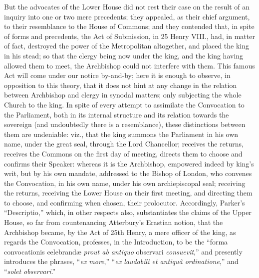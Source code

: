 But the advocates of the Lower
House did not rest their case on the result of an inquiry into one or
two mere precedents; they appealed, as their chief argument, to their
resemblance to the House of Commons; and they contended that, in spite
of forms and precedents, the Act of Submission, in 25 Henry VIII.,
had, in matter of fact, destroyed the power of the Metropolitan
altogether, and placed the king in his stead; so that the clergy being
now under the king, and the king having allowed them to meet, the
Archbishop could not interfere with them. This famous Act will come
under our notice by-and-by; here it is enough to observe, in
opposition to this theory, that it does not hint at any change in the
relation between Archbishop and clergy in synodal matters; only
subjecting the whole Church to the king. In spite of every attempt to
assimilate the Convocation to the Parliament, both in its internal
structure and its relation towards the sovereign (and undoubtedly
there is a resemblance), these distinctions between them are
undeniable: viz., that the king summons the Parliament in his own
name, under the great seal, through the Lord Chancellor; receives the
returns, receives the Commons on the first day of meeting, directs
them to choose and confirms their Speaker: whereas it is the
Archbishop, empowered indeed by king's writ, but by his own mandate,
addressed to the Bishop of London, who convenes the Convocation, in
his own name, under his own archiepiscopal seal; receiving the
returns, receiving the Lower House on their first meeting, and
directing them to choose, and confirming when chosen, their
prolocutor. Accordingly, Parker's ``Descriptio,'' which, in other
respects also, substantiates the claims of the Upper House, so far
from countenancing Atterbury's Erastian notion, that the Archbishop
became, by the Act of 25th Henry, a mere officer of the king, as
regards the Convocation, professes, in the Introduction, to be the ``forma
convocationis celebrandæ \emph{prout ab antiquo} observari \emph{consuevit},''
and presently introduces the phrases, ``\emph{ex more},'' ``\emph{ex
laudabili et antiquâ ordinatione},'' and ``\emph{solet observari}.''

